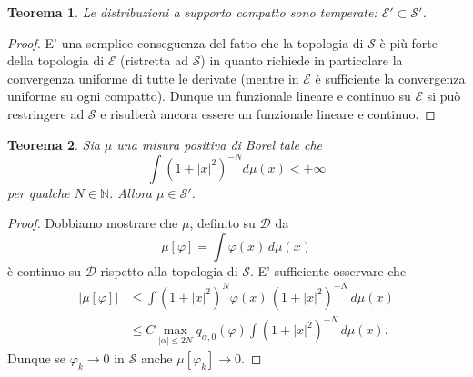 \documentclass[italian,a4paper,oneside,headinclude]{scrbook}
\renewcommand{\phi}{\varphi}
\newcommand{\loc}{\mathit{loc}}
\newcommand{\D}{\mathcal D}
\newcommand{\E}{\mathcal E}
\renewcommand{\S}{\mathcal S}
\newcommand{\NN}{\mathbb N}
\newcommand{\abs}[1]{{\left|#1\right|}}
\newtheorem{theorem}{Teorema}
\begin{document}
\begin{theorem}
  Le distribuzioni a supporto compatto sono temperate:
  $\E'\subset \S'$.
\end{theorem}
%
\begin{proof}
  E' una semplice conseguenza del fatto che la topologia di $\S$ è più forte
  della topologia di $\E$ (ristretta ad $\S$) in quanto richiede in
  particolare la
  convergenza uniforme di tutte le derivate (mentre in $\E$ è
  sufficiente la convergenza uniforme su ogni compatto).
  Dunque un funzionale lineare e continuo su $\E$ si può restringere
  ad $\S$ e risulterà ancora essere un funzionale lineare e continuo.
\end{proof}

\begin{theorem}
  Sia $\mu$ una misura positiva di Borel tale che
  \[
  \int (1+\abs{x}^2)^{-N} d\mu(x) < +\infty
  \]
  per qualche $N\in\NN$. Allora $\mu\in \S'$.
\end{theorem}
%
\begin{proof}
  Dobbiamo mostrare che $\mu$, definito su $\D$ da
  \[
  \mu[\phi] = \int \phi(x)\, d\mu(x)
  \]
  è continuo su $\D$ rispetto alla topologia di $\S$.
  E' sufficiente osservare che
  \begin{align*}
    \abs{\mu[\phi]}
    &\le \int (1+\abs{x}^2)^N\phi(x)\, (1+\abs{x}^2)^{-N}\, d\mu(x)\\
    &\le C \max_{\abs{\alpha}\le 2N} q_{\alpha,0}(\phi)
    \int
  (1+\abs{x}^2)^{-N}\, d\mu(x).
  \end{align*}
  Dunque se $\phi_k\to 0$ in $\S$ anche $\mu[\phi_k]\to 0$.
\end{proof}

\begin{comment}
\begin{theorem}
  Se $\phi\in L^1_\loc$ ha crescita al più polinomiale, cioè esiste
  $C>0$ ed $N\in \NN$ tali che
  \[
  \abs{\phi(x)} \le C ((1+\abs{x}^2)^N)
  \]
  allora $\phi \in \S'$.
\end{theorem}
%
\begin{proof}
  Consideriamo la misura $\mu = C (1+\abs{x}^2)^N dx$. Si avrà
  \[
  \int (1+\abs{x}^2)^{-N-n} \, d\mu(x)
  \le \int \frac{C}{(1+\abs{x}^2}^n}\, dx < +\infty.
  \]
  Dunque per il teorema precedente si ha che $\mu \in \S'$.
  Chiaramente si ha
  \[
  \abs{\phi[\psi]} \le \abs{\int \phi(x)\psi(x)\, dx}
  \le \abs{\int C(1+\abs{x}^2)^N \phi(x)\, dx
  = \abs{\int \psi(x)\, d\mu(x)} = \abs{\mu[\psi]}.
  \]
  e dunque se $\mu$ è continuo su $\S$ anche $\phi$ lo è.
\end{proof}
\end{comment}
\end{document}
